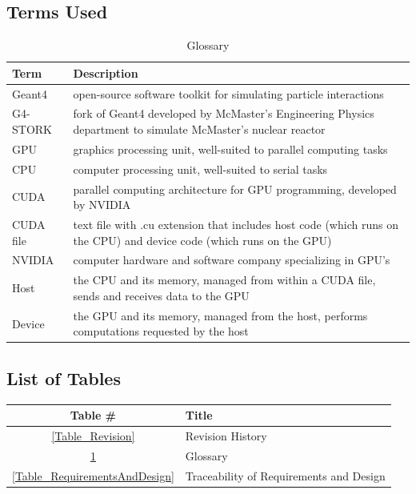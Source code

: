 \documentclass[12pt]{article}
\begin{document}
\subsection{Terms Used}
\begin{table}[h]
\centering
\caption{Glossary}\label{Table_Glossary}
\begin{tabularx}{\textwidth}{lX}
\toprule
\bf Term & \bf Description\\\midrule\vspace{1mm}
Geant4 & open-source software toolkit for simulating particle interactions\\\vspace{1mm}
G4-STORK & fork of Geant4 developed by McMaster's Engineering Physics department to simulate McMaster's nuclear reactor\\\vspace{1mm}
GPU & graphics processing unit, well-suited to parallel computing tasks\\\vspace{1mm}
CPU & computer processing unit, well-suited to serial tasks\\\vspace{1mm}
CUDA & parallel computing architecture for GPU programming, developed by NVIDIA\\\vspace{1mm}
CUDA file & text file with .cu extension that includes host code (which runs on the CPU) and device code (which runs on the GPU)\\\vspace{1mm}
NVIDIA & computer hardware and software company specializing in GPU's\\\vspace{1mm}
Host & the CPU and its memory, managed from within a CUDA file, sends and receives data to the GPU\\\vspace{1mm}
Device & the GPU and its memory, managed from the host, performs computations requested by the host\\
\bottomrule
\end{tabularx}
\end{table}

\subsection{List of Tables}
\begin{center}
\begin{tabular}{cl}
\toprule
\bf Table \# & \bf Title\\\midrule
\ref{Table_Revision} & Revision History\\
\ref{Table_Glossary} & Glossary\\
\ref{Table_RequirementsAndDesign} & Traceability of Requirements and Design\\
\bottomrule
\end{tabular}
\end{center}
\end{document}
